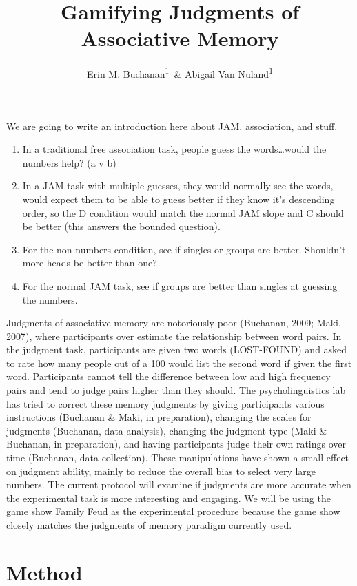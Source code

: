 \documentclass[man]{apa6}
\title{Gamifying Judgments of Associative Memory}
\author{Erin M. Buchanan\textsuperscript{1}~\& Abigail Van
Nuland\textsuperscript{1}}
\date{}
\affiliation{
\vspace{0.5cm}
\textsuperscript{1} Missouri State University}
\providecommand{\tightlist}{%
  \setlength{\itemsep}{0pt}\setlength{\parskip}{0pt}}
\theoremstyle{definition}
\theoremstyle{definition}
\theoremstyle{definition}
\theoremstyle{remark}
\begin{document}
\maketitle

We are going to write an introduction here about JAM, association, and
stuff.

\begin{enumerate}
\def\labelenumi{\arabic{enumi})}
\tightlist
\item
  In a traditional free association task, people guess the
  words\ldots{}would the numbers help? (a v b)
\item
  In a JAM task with multiple guesses, they would normally see the
  words, would expect them to be able to guess better if they know it's
  descending order, so the D condition would match the normal JAM slope
  and C should be better (this answers the bounded question).
\item
  For the non-numbers condition, see if singles or groups are better.
  Shouldn't more heads be better than one?
\item
  For the normal JAM task, see if groups are better than singles at
  guessing the numbers.
\end{enumerate}

Judgments of associative memory are notoriously poor (Buchanan, 2009;
Maki, 2007), where participants over estimate the relationship between
word pairs. In the judgment task, participants are given two words
(LOST-FOUND) and asked to rate how many people out of a 100 would list
the second word if given the first word. Participants cannot tell the
difference between low and high frequency pairs and tend to judge pairs
higher than they should. The psycholinguistics lab has tried to correct
these memory judgments by giving participants various instructions
(Buchanan \& Maki, in preparation), changing the scales for judgments
(Buchanan, data analysis), changing the judgment type (Maki \& Buchanan,
in preparation), and having participants judge their own ratings over
time (Buchanan, data collection). These manipulations have shown a small
effect on judgment ability, mainly to reduce the overall bias to select
very large numbers. The current protocol will examine if judgments are
more accurate when the experimental task is more interesting and
engaging. We will be using the game show Family Feud as the experimental
procedure because the game show closely matches the judgments of memory
paradigm currently used.

\hypertarget{method}{%
\section{Method}\label{method}}
\end{document}
